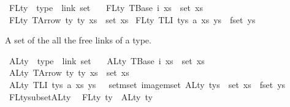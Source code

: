 \begin{isabellebody}
\begin{isamarkuptext}
\end{isamarkuptext}\isamarkuptrue%
\isamarkupfalse%
\ FLty\ {\isacharcolon}{\kern0pt}{\isacharcolon}{\kern0pt}\ {\isachardoublequoteopen}type\ {\isacharequal}{\kern0pt}{\isachargreater}{\kern0pt}\ link\ set{\isachardoublequoteclose}\ \isanewline
\ \ {\isachardoublequoteopen}FLty\ {\isacharparenleft}{\kern0pt}TBase\ i\ xs{\isacharparenright}{\kern0pt}\ {\isacharequal}{\kern0pt}\ set\ xs{\isachardoublequoteclose}\isanewline
{\isacharbar}{\kern0pt}\ {\isachardoublequoteopen}FLty\ {\isacharparenleft}{\kern0pt}TArrow\ ty{}\ ty{}\ xs{\isacharparenright}{\kern0pt}\ {\isacharequal}{\kern0pt}\ set\ xs{\isachardoublequoteclose}\isanewline
{\isacharbar}{\kern0pt}\ {\isachardoublequoteopen}FLty\ {\isacharparenleft}{\kern0pt}TLI\ tys\ a\ xs\ ys{\isacharparenright}{\kern0pt}\ {\isacharequal}{\kern0pt}\ fset\ ys{\isachardoublequoteclose}%
\begin{isamarkuptext}%
A set of the all the free links of a type.%
\end{isamarkuptext}\isamarkuptrue%
\isamarkupfalse%
\ ALty\ {\isacharcolon}{\kern0pt}{\isacharcolon}{\kern0pt}\ {\isachardoublequoteopen}type\ {\isacharequal}{\kern0pt}{\isachargreater}{\kern0pt}\ link\ set{\isachardoublequoteclose}\ \isanewline
\ \ {\isachardoublequoteopen}ALty\ {\isacharparenleft}{\kern0pt}TBase\ i\ xs{\isacharparenright}{\kern0pt}\ {\isacharequal}{\kern0pt}\ set\ xs{\isachardoublequoteclose}\isanewline
{\isacharbar}{\kern0pt}\ {\isachardoublequoteopen}ALty\ {\isacharparenleft}{\kern0pt}TArrow\ ty{}\ ty{}\ xs{\isacharparenright}{\kern0pt}\ {\isacharequal}{\kern0pt}\ set\ xs{\isachardoublequoteclose}\isanewline
{\isacharbar}{\kern0pt}\ {\isachardoublequoteopen}ALty\ {\isacharparenleft}{\kern0pt}TLI\ tys\ a\ xs\ ys{\isacharparenright}{\kern0pt}\ {\isacharequal}{\kern0pt}\ {\isasymUnion}\ {\isacharparenleft}{\kern0pt}set{\isacharunderscore}{\kern0pt}mset\ {\isacharparenleft}{\kern0pt}image{\isacharunderscore}{\kern0pt}mset\ ALty\ tys{\isacharparenright}{\kern0pt}{\isacharparenright}{\kern0pt}\ {\isasymunion}\ set\ xs\ {\isasymunion}\ fset\ ys{\isachardoublequoteclose}\isanewline
\isanewline
\isanewline
\isanewline
{}\isamarkupfalse%
\ FLty{\isacharunderscore}{\kern0pt}subset{\isacharunderscore}{\kern0pt}ALty{\isacharcolon}{\kern0pt}\isanewline
\ \ {\isachardoublequoteopen}FLty\ ty\ {\isasymsubseteq}\ ALty\ ty{\isachardoublequoteclose}\isanewline
%
\isadelimproof
%
\endisadelimproof
%

\end{isabellebody}
